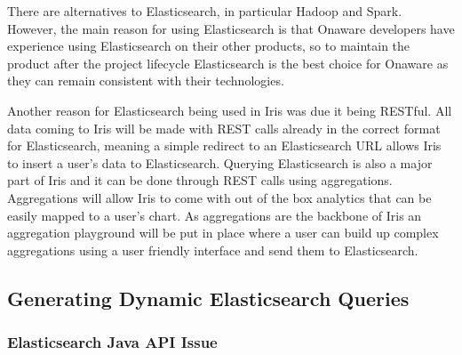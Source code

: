 \documentclass[12pt,a4paper,titlepage]{report}
\begin{document}
There are alternatives to Elasticsearch, in particular  Hadoop and Spark. However, the main reason for using Elasticsearch is that Onaware developers have experience using Elasticsearch on their other products, so to maintain the product after the project lifecycle Elasticsearch is the best choice for Onaware as they can remain consistent with their technologies.

Another reason for Elasticsearch being used in Iris was due it being RESTful. All data coming to Iris will be made with REST calls already in the correct format for Elasticsearch, meaning a simple redirect to an Elasticsearch URL allows Iris to insert a user's data to Elasticsearch. Querying Elasticsearch is also a major part of Iris and it can be done through REST calls using aggregations. Aggregations will allow Iris to come with out of the box analytics that can be easily mapped to a user's chart. As aggregations are the backbone of Iris an aggregation playground will be put in place where a user can build up complex aggregations using a user friendly interface and send them to Elasticsearch. 

\subsection{Generating Dynamic Elasticsearch Queries}\label{sec:GDE}

\subsubsection{Elasticsearch Java API Issue}
\end{document}

